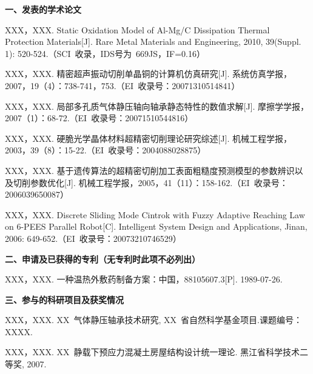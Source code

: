 \begin{publication}
\noindent\textbf{一、发表的学术论文}
\begin{publist}
\item	XXX，XXX. Static Oxidation Model of Al-Mg/C Dissipation Thermal Protection Materials[J]. Rare Metal Materials and Engineering, 2010, 39(Suppl. 1): 520-524.（SCI~收录，IDS号为~669JS，IF=0.16）
\item XXX，XXX. 精密超声振动切削单晶铜的计算机仿真研究[J]. 系统仿真学报，2007，19（4）：738-741，753.（EI~收录号：20071310514841）
\item XXX，XXX. 局部多孔质气体静压轴向轴承静态特性的数值求解[J]. 摩擦学学报，2007（1）：68-72.（EI~收录号：20071510544816）
\item XXX，XXX. 硬脆光学晶体材料超精密切削理论研究综述[J]. 机械工程学报，2003，39（8）：15-22.（EI~收录号：2004088028875）
\item XXX，XXX. 基于遗传算法的超精密切削加工表面粗糙度预测模型的参数辨识以及切削参数优化[J]. 机械工程学报，2005，41（11）：158-162.（EI~收录号：2006039650087）
\item XXX，XXX. Discrete Sliding Mode Cintrok with Fuzzy Adaptive Reaching Law on 6-PEES Parallel Robot[C]. Intelligent System Design and Applications, Jinan, 2006: 649-652.（EI~收录号：20073210746529）
\end{publist}

\noindent\textbf{二、申请及已获得的专利（无专利时此项不必列出）}
\begin{publist}
\item XXX，XXX. 一种温热外敷药制备方案：中国，88105607.3[P]. 1989-07-26.
\end{publist}

\noindent\textbf{三、参与的科研项目及获奖情况}
\begin{publist}
\item	XXX，XXX. XX~气体静压轴承技术研究, XX~省自然科学基金项目.课题编号：XXXX.
\item XXX，XXX. XX~静载下预应力混凝土房屋结构设计统一理论. 黑江省科学技术二等奖, 2007.
\end{publist}
\end{publication}
